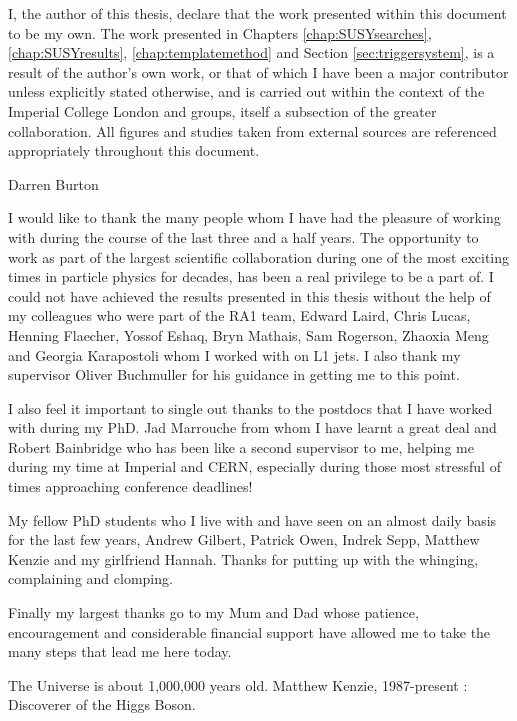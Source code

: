 \begin{declaration}
  I, the author of this thesis, declare that the work presented within this document to be my own.  The work presented in Chapters \ref{chap:SUSYsearches}, \ref{chap:SUSYresults},  \ref{chap:templatemethod} and Section \ref{sec:triggersystem}, is a result of the author's own work, or that of which I have been a major contributor unless explicitly stated otherwise, and is carried out within the context of the Imperial College London and \CERN \SUSY groups, itself a subsection of the greater \CMS collaboration.  All figures and studies taken from external sources are referenced appropriately throughout this document.
  
  \vspace*{1cm}
  \begin{flushright}
    Darren Burton
  \end{flushright}
\end{declaration}


\begin{acknowledgements}
  I would like to thank the many people whom I have had the pleasure of working with during the course of the last three and a half years. The opportunity to work as part of the largest scientific collaboration during one of the most exciting times in particle physics for decades, has been a real privilege to be a part of. I could not have achieved the results presented in this thesis without the help of my colleagues who were part of the RA1 team, Edward Laird, Chris Lucas, Henning Flaecher, Yossof Eshaq, Bryn Mathais, Sam Rogerson, Zhaoxia Meng and Georgia Karapostoli whom I worked with on L1 jets. I also thank my supervisor Oliver Buchmuller for his guidance in getting me to this point. 
 
I also feel it important to single out thanks to the postdocs that I have worked with during my PhD. Jad Marrouche from whom I have learnt a great deal and Robert Bainbridge who has been like a second supervisor to me, helping me during my time at Imperial and CERN, especially during those most stressful of times approaching conference deadlines! 

My fellow PhD students who I live with and have seen on an almost daily basis for the last few years, Andrew Gilbert, Patrick Owen, Indrek Sepp, Matthew Kenzie and my girlfriend Hannah. Thanks for putting up with the whinging, complaining and clomping. 

Finally my largest thanks go to my Mum and Dad whose patience, encouragement and considerable financial support have allowed me to take the many steps that lead me here today. 
 
\end{acknowledgements}

\tableofcontents
\listoffigures
\listoftables
\newpage

\frontquote%
  {The Universe is about 1,000,000 years old.}%
  {Matthew Kenzie, 1987-present : Discoverer of the Higgs Boson.}
